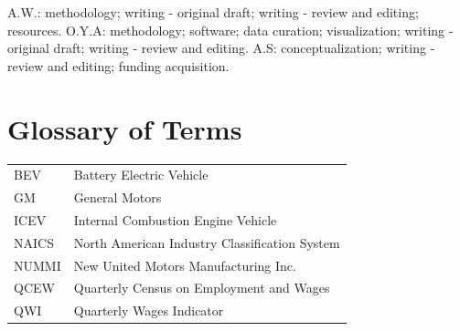 \documentclass[sn-mathphys,Numbered]{sn-jnl}%
\begin{document}
A.W.: methodology; writing - original draft; writing - review and editing; resources. O.Y.A: methodology; software; data curation; visualization; writing - original draft; writing - review and editing. A.S: conceptualization; writing - review and editing; funding acquisition.

\section*{Glossary of Terms}
\begin{tabular}{ l l }
    BEV & Battery Electric Vehicle \\
    GM & General Motors \\
    ICEV & Internal Combustion Engine Vehicle \\
    NAICS & North American Industry Classification System \\
    NUMMI & New United Motors Manufacturing Inc. \\
    QCEW & Quarterly Census on Employment and Wages \\
    QWI & Quarterly Wages Indicator 
\end{tabular}



\clearpage


\clearpage
\end{document}
